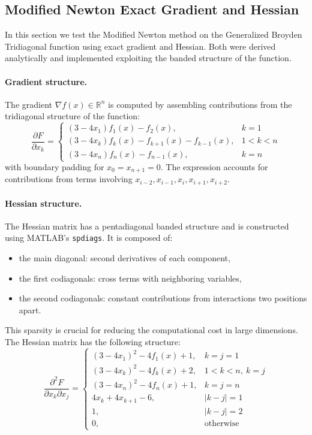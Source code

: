 \documentclass[a4paper,12pt]{article}
\begin{document}
	
	\subsection{Modified Newton Exact Gradient and Hessian}
	
	In this section we test the Modified Newton method on the Generalized Broyden Tridiagonal function using exact gradient and Hessian. Both were derived analytically and implemented exploiting the banded structure of the function.
	
	\paragraph{Gradient structure.}
	The gradient \( \nabla f(x) \in \mathbb{R}^{n} \) is computed by assembling contributions from the tridiagonal structure of the function:
	\[
	\frac{\partial F}{\partial x_k} =
	\begin{cases}
		(3 - 4x_1)f_1(x) - f_2(x), & k = 1 \\
		(3 - 4x_k)f_k(x) - f_{k+1}(x) - f_{k-1}(x), & 1 < k < n \\
		(3 - 4x_n)f_n(x) - f_{n-1}(x), & k = n
	\end{cases}
	\]
	with boundary padding for \( x_0 = x_{n+1} = 0 \). The expression accounts for contributions from terms involving \( x_{i-2}, x_{i-1}, x_i, x_{i+1}, x_{i+2} \).
	
	\paragraph{Hessian structure.}
	The Hessian matrix has a pentadiagonal banded structure and is constructed using MATLAB’s \verb|spdiags|. It is composed of:
	\begin{itemize}[nosep]
		\item the main diagonal: second derivatives of each component,
		\item the first codiagonals: cross terms with neighboring variables,
		\item the second codiagonals: constant contributions from interactions two positions apart.
	\end{itemize}
	
	This sparsity is crucial for reducing the computational cost in large dimensions.
	The Hessian matrix has the following structure:
	\[
	\frac{\partial^2 F}{\partial x_k \partial x_j} =
	\begin{cases}
		(3 - 4x_1)^2 - 4f_1(x) + 1, & k = j = 1 \\
		(3 - 4x_k)^2 - 4f_k(x) + 2, & 1 < k < n,\ k = j \\
		(3 - 4x_n)^2 - 4f_n(x) + 1, & k = j = n \\
		4x_k + 4x_{k+1} - 6, & |k - j| = 1 \\
		1, & |k - j| = 2 \\
		0, & \text{otherwise}
	\end{cases}
	\]
	\newpage
\end{document}
